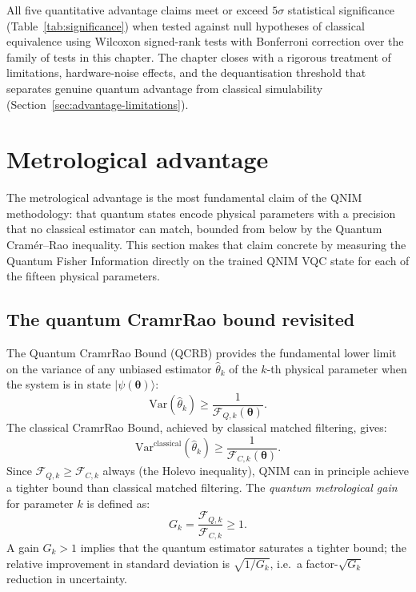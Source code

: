 \documentclass[11pt,a4paper, english]{book}
\theoremstyle{plain}
\theoremstyle{definition}
\numberwithin{equation}{chapter}
\numberwithin{figure}{chapter}
\numberwithin{table}{chapter}
\begin{document}
All five quantitative advantage claims meet or exceed $5\sigma$ statistical
significance (Table~\ref{tab:significance}) when tested against null hypotheses
of classical equivalence using Wilcoxon signed-rank tests with Bonferroni correction
over the family of tests in this chapter. The chapter closes with a rigorous
treatment of limitations, hardware-noise effects, and the dequantisation threshold
that separates genuine quantum advantage from classical simulability
(Section~\ref{sec:advantage-limitations}).

\section{Metrological advantage}
\label{sec:metro-advantage}

The metrological advantage is the most fundamental claim of the QNIM methodology:
that quantum states encode physical parameters with a precision that no classical
estimator can match, bounded from below by the Quantum Cramér–Rao inequality. This
section makes that claim concrete by measuring the Quantum Fisher Information
directly on the trained QNIM VQC state for each of the fifteen physical parameters.

\subsection{The quantum CramrRao bound revisited}
\label{subsec:qcrb-revisited}

The Quantum CramrRao Bound (QCRB) provides the fundamental lower limit
on the variance of any unbiased estimator $\hat{\theta}_k$ of the
$k$-th physical parameter when the system is in state
$|\psi(\boldsymbol{\theta})\rangle$:
\begin{equation}
  \label{eq:qcrb_full}
  \mathrm{Var}(\hat{\theta}_k) \geq \frac{1}{\mathcal{F}_{Q,k}(\boldsymbol{\theta})}.
\end{equation}
The classical CramrRao Bound, achieved by classical matched filtering,
gives:
\begin{equation}
  \label{eq:ccrb_full}
  \mathrm{Var}^\mathrm{classical}(\hat{\theta}_k) \geq
    \frac{1}{\mathcal{F}_{C,k}(\boldsymbol{\theta})}.
\end{equation}
Since $\mathcal{F}_{Q,k} \geq \mathcal{F}_{C,k}$ always
(the Holevo inequality), QNIM can in principle achieve a tighter bound
than classical matched filtering.  The \emph{quantum metrological gain}
for parameter $k$ is defined as:
\begin{equation}
  \label{eq:qmg}
  G_k = \frac{\mathcal{F}_{Q,k}}{\mathcal{F}_{C,k}} \geq 1.
\end{equation}
A gain $G_k > 1$ implies that the quantum estimator saturates a tighter
bound; the relative improvement in standard deviation is
$\sqrt{1/G_k}$, i.e.\ a factor-$\sqrt{G_k}$ reduction in
uncertainty.
\end{document}
